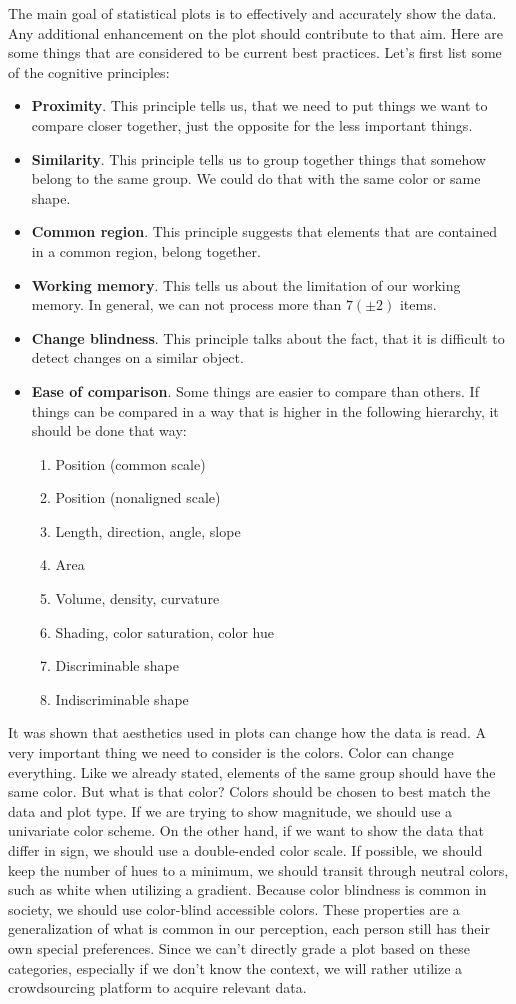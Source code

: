 \documentclass[fleqn,moreauthors,10pt]{ds_report}
\begin{document}
	The main goal of statistical plots is to effectively and accurately show the data. Any additional enhancement on the plot should contribute to that aim. Here are some things that are considered to be current best practices. Let's first list some of the cognitive principles:
	\begin{itemize}[noitemsep] 
		\item \textbf{Proximity}.
		This principle tells us, that we need to put things we want to compare closer together, just the opposite for the less important things.
		\item \textbf{Similarity}.
		This principle tells us to group together things that somehow belong to the same group. We could do that with the same color or same shape.
		\item \textbf{Common region}.
		This principle suggests that elements that are contained in a common region, belong together.
		\item \textbf{Working memory}.
		This tells us about the limitation of our working memory. In general, we can not process more than $7 (\pm 2)$ items.
		\item \textbf{Change blindness}.
		This principle talks about the fact, that it is difficult to detect changes on a similar object.
		\item \textbf{Ease of comparison}.
		Some things are easier to compare than others. If things can be compared in a way that is higher in the following hierarchy, it should be done that way:
		\begin{enumerate}[noitemsep] 
			\item Position (common scale)
			\item Position (nonaligned scale)
			\item Length, direction, angle, slope
			\item Area
			\item Volume, density, curvature
			\item Shading, color saturation, color hue
			\item Discriminable shape
			\item Indiscriminable shape
		\end{enumerate}
	\end{itemize}
	It was shown that aesthetics used in plots can change how the data is read. A very important thing we need to consider is the colors. Color can change everything. Like we already stated, elements of the same group should have the same color. But what is that color? Colors should be chosen to best match the data and plot type. If we are trying to show magnitude, we should use a univariate color scheme. On the other hand, if we want to show the data that differ in sign, we should use a double-ended color scale. If possible, we should keep the number of hues to a minimum, we should transit through neutral colors, such as white when utilizing a gradient. Because color blindness is common in society, we should use color-blind accessible colors. These properties are a generalization of what is common in our perception, each person still has their own special preferences. Since we can't directly grade a plot based on these categories, especially if we don't know the context, we will rather utilize a crowdsourcing platform to acquire relevant data.
\end{document}
